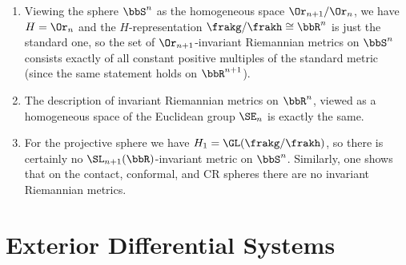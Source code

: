 \begin{example}
    \begin{enumerate}
        \item Viewing the sphere $\bbS^n$ as the homogeneous space $\Or_{n+1}\slash \Or_n$, we have $H=\Or_n$ and the $H$-representation $\frakg\slash\frakh\cong\bbR^n$ is just the standard one, so the set of $\Or_{n+1}$-invariant Riemannian metrics on $\bbS^n$ consists exactly of all constant positive multiples of the standard metric (since the same statement holds on $\bbR^{n+1}$).
        \item The description of invariant Riemannian metrics on $\bbR^n$, viewed as a homogeneous space of the Euclidean group $\SE_n$ is exactly the same. 
        \item For the projective sphere we have $H_1=\GL(\frakg\slash\frakh)$, so there is certainly no $\SL_{n+1}(\bbR)$-invariant metric on $\bbS^n$. Similarly, one shows that on the contact, conformal, and CR spheres there are no invariant Riemannian metrics.
    \end{enumerate}
\end{example}

















\clearpage
\section{Exterior Differential Systems}\label{sec: PDE's}


